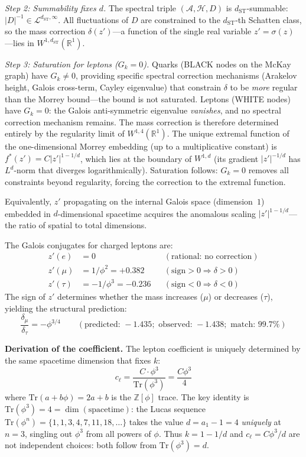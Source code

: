 \documentclass[12pt,a4paper]{article}
\theoremstyle{definition}
\begin{document}
\emph{Step 2: Summability fixes $d$.}  The spectral triple $(\mathcal{A}, \mathcal{H}, D)$ is $d_{\text{ST}}$-summable: $|D|^{-1} \in \mathcal{L}^{d_{\text{ST}},\infty}$.  All fluctuations of $D$ are constrained to the $d_{\text{ST}}$-th Schatten class, so the mass correction $\delta(z')$---a function of the single real variable $z' = \sigma(z)$---lies in $W^{1,d_{\text{ST}}}(\mathbb{R}^1)$.

\emph{Step 3: Saturation for leptons ($G_k = 0$).}  Quarks (BLACK nodes on the McKay graph) have $G_k \neq 0$, providing specific spectral correction mechanisms (Arakelov height, Galois cross-term, Cayley eigenvalue) that constrain $\delta$ to be \emph{more} regular than the Morrey bound---the bound is not saturated.  Leptons (WHITE nodes) have $G_k = 0$: the Galois anti-symmetric eigenvalue \emph{vanishes}, and no spectral correction mechanism remains.  The mass correction is therefore determined entirely by the regularity limit of $W^{1,4}(\mathbb{R}^1)$.  The unique extremal function of the one-dimensional Morrey embedding (up to a multiplicative constant) is $f^*(z') = C|z'|^{1-1/d}$, which lies at the boundary of $W^{1,d}$ (its gradient $|z'|^{-1/d}$ has $L^d$-norm that diverges logarithmically).  Saturation follows: $G_k = 0$ removes all constraints beyond regularity, forcing the correction to the extremal function.

Equivalently, $z'$ propagating on the internal Galois space (dimension~$1$) embedded in $d$-dimensional spacetime acquires the anomalous scaling $|z'|^{1-1/d}$---the ratio of spatial to total dimensions.

The Galois conjugates for charged leptons are:
\begin{align}
z'(e) &= 0 && (\text{rational: no correction}) \\
z'(\mu) &= 1/\phi^2 = +0.382 && (\text{sign} > 0 \Rightarrow \delta > 0) \\
z'(\tau) &= -1/\phi^3 = -0.236 && (\text{sign} < 0 \Rightarrow \delta < 0)
\end{align}
The sign of $z'$ determines whether the mass increases ($\mu$) or decreases ($\tau$), yielding the structural prediction:
\begin{equation}
\frac{\delta_\mu}{\delta_\tau} = -\phi^{3/4} \qquad (\text{predicted: } -1.435; \text{ observed: } -1.438; \text{ match: } 99.7\%)
\end{equation}

\textbf{Derivation of the coefficient.} The lepton coefficient is uniquely determined by the same spacetime dimension that fixes $k$:
\begin{equation}
\boxed{c_\ell = \frac{C \cdot \phi^3}{\mathrm{Tr}(\phi^3)} = \frac{C \phi^3}{4}}
\label{eq:cell}
\end{equation}
where $\mathrm{Tr}(a + b\phi) = 2a + b$ is the $\mathbb{Z}[\phi]$ trace.  The key identity is $\mathrm{Tr}(\phi^3) = 4 = \dim(\text{spacetime})$: the Lucas sequence $\mathrm{Tr}(\phi^n) = \{1, 1, 3, 4, 7, 11, 18, \ldots\}$ takes the value $d = a_1 - 1 = 4$ \emph{uniquely} at $n = 3$, singling out $\phi^3$ from all powers of $\phi$.  Thus $k = 1 - 1/d$ and $c_\ell = C\phi^3/d$ are not independent choices: both follow from $\mathrm{Tr}(\phi^3) = d$.
\end{document}
